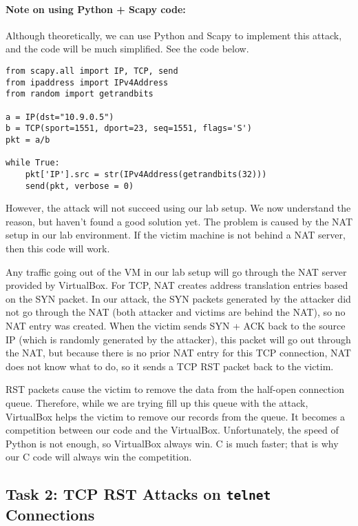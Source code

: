 \paragraph{Note on using Python + Scapy code:} 
Although theoretically, we can use Python and Scapy to implement this attack,
and the code will be much simplified. See the code below. 

\begin{lstlisting}
from scapy.all import IP, TCP, send
from ipaddress import IPv4Address
from random import getrandbits

a = IP(dst="10.9.0.5")
b = TCP(sport=1551, dport=23, seq=1551, flags='S')
pkt = a/b

while True:
    pkt['IP'].src = str(IPv4Address(getrandbits(32)))
    send(pkt, verbose = 0)
\end{lstlisting}


However, the attack will not succeed using our lab setup. We now understand
the reason, but haven't found a good solution yet. The problem is caused by
the NAT setup in our lab environment. If the victim machine is not 
behind a NAT server, then this code will work.


Any traffic going out of the VM in our lab setup will go through the NAT server
provided by VirtualBox. For TCP, NAT creates address translation 
entries based on the SYN packet. 
In our attack, the SYN packets generated 
by the attacker did not go through the NAT (both attacker and victims are behind the 
NAT), so no NAT entry was created. When the victim sends SYN + ACK back to the
source IP (which is randomly generated by the attacker), this packet will 
go out through the NAT, but because there is no prior NAT entry
for this TCP connection, NAT does not know what to do,
so it sends a TCP RST packet back to the victim. 

RST packets cause the victim to remove the data from the half-open connection
queue. Therefore, while we are trying fill up this queue with the attack, 
VirtualBox helps the victim to remove our records from the queue. 
It becomes a competition between our code and the VirtualBox. 
Unfortunately, the speed of Python is not enough, so VirtualBox always win.
C is much faster; that is why our C code will always win the competition. 


\subsection {Task 2: TCP RST Attacks on \texttt{telnet} Connections}


